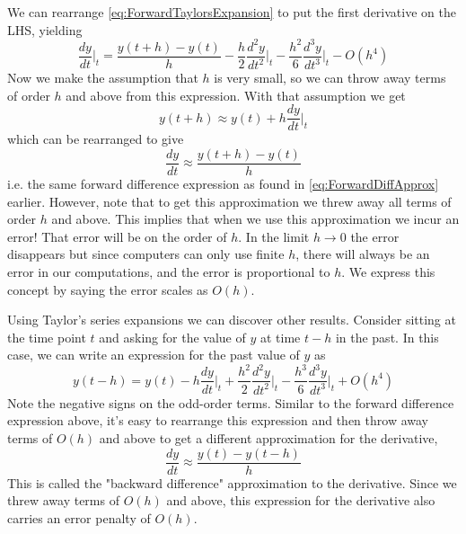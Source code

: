 \documentclass[hidelinks,notitlepage]{book}
\begin{document}
We can rearrange \cref{eq:ForwardTaylorsExpansion} to put the first derivative on the LHS, yielding
\begin{equation}
\nonumber
\frac{d y}{d t} \biggr\rvert_{t} =
\frac{y(t+h) - y(t)}{h}
- \frac{h}{2} \frac{d^2 y}{d t^2} \biggr\rvert_{t}
- \frac{h^2}{6} \frac{d^3 y}{d t^3} \biggr\rvert_{t}
- O(h^4)
\end{equation}
Now we make the assumption that $h$ is very small, so we can throw away terms of order $h$ and above from this expression.  With that assumption we get
\begin{equation}
\nonumber
y(t+h) \approx y(t) 
+ h \frac{d y}{d t} \biggr\rvert_{t}
\end{equation}
which can be rearranged to give
\begin{equation}
\label{eq:ForwardDiffApprox1}
\frac{d y}{d t} \approx
\frac{y(t + h) - y(t)}{h}
\end{equation}
i.e. the same forward difference expression as found in \cref{eq:ForwardDiffApprox} earlier.  However, note that to get this approximation we threw away all terms of order $h$ and above.  This implies that when we use this approximation we incur an error!  That error will be on the order of $h$.  In the limit $h \rightarrow 0$ the error disappears but since computers can only use finite $h$, there will always be an error in our computations, and the error is proportional to $h$.  We express this concept by saying the error scales as $O(h)$.

Using Taylor's series expansions we can discover other results.  Consider sitting at the time point $t$ and asking for the value of $y$ at time $t - h$ in the past. In this case, we can write an expression for the past value of $y$ as
\begin{equation}
\label{eq:BackwardTaylorsExpansion}
y(t-h) = y(t) 
- h \frac{d y}{d t} \biggr\rvert_{t}
+ \frac{h^2}{2} \frac{d^2 y}{d t^2} \biggr\rvert_{t}
- \frac{h^3}{6} \frac{d^3 y}{d t^3} \biggr\rvert_{t}
+ O(h^4)
\end{equation}
Note the negative signs on the odd-order terms.  Similar to the forward difference expression above, it's easy to rearrange this expression and then throw away terms of $O(h)$ and above to get a different approximation for the derivative,
\begin{equation}
\label{eq:BackwardDiffApprox}
\frac{d y}{d t} \approx
\frac{y(t) - y(t-h)}{h}
\end{equation}
This is called the "backward difference" approximation to the derivative.  Since we threw away terms of $O(h)$ and above, this expression for the derivative also carries an error penalty of $O(h)$.
\end{document}
